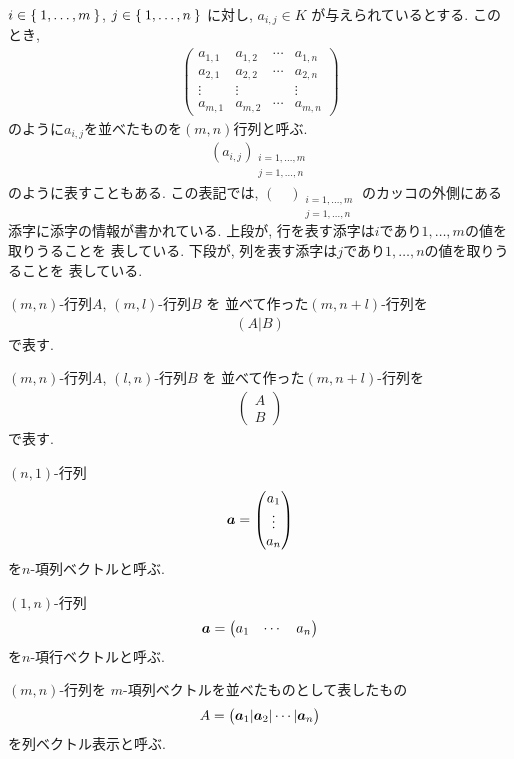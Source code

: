 $i\in\Set{1,\ldots,m}$,
$j\in\Set{1,\ldots,n}$
に対し,
$a_{i,j}\in K$
が与えられているとする.
このとき,
\begin{align*}
    \begin{pmatrix}
      a_{1,1}&a_{1,2}&\cdots &a_{1,n}\\
      a_{2,1}&a_{2,2}&\cdots &a_{2,n}\\
      \vdots&\vdots &&\vdots\\
      a_{m,1}&a_{m,2}&\cdots &a_{m,n}
    \end{pmatrix}
\end{align*}
のように$a_{i,j}$を並べたものを$(m,n)$行列と呼ぶ.
\begin{align*}
  (a_{i,j})_{\substack{i=1,\ldots,m\\j=1,\ldots,n}}
\end{align*}
のように表すこともある.
この表記では,
$(\quad)_{\substack{i=1,\ldots,m\\j=1,\ldots,n}}$
のカッコの外側にある添字に添字の情報が書かれている.
上段が, 行を表す添字は$i$であり$1,\ldots,m$の値を取りうることを
表している.
下段が, 列を表す添字は$j$であり$1,\ldots,n$の値を取りうることを
表している.

$(m,n)$-行列$A$,
$(m,l)$-行列$B$
を
並べて作った$(m,n+l)$-行列を
\begin{align*}(A|B)\end{align*}
で表す.

$(m,n)$-行列$A$,
$(l,n)$-行列$B$
を
並べて作った$(m,n+l)$-行列を
\begin{align*}
  \begin{pmatrix}A\\\hline B\end{pmatrix}\end{align*}
で表す.

$(n,1)$-行列
\begin{align*}
  \boldsymbol{a}=
  \begin{pmatrix}a_1
  \\\vdots\\a_n
  \end{pmatrix}
\end{align*}
を$n$-項列ベクトルと呼ぶ.

$(1,n)$-行列
\begin{align*}
  \boldsymbol{a}=
  \begin{pmatrix}a_1
  &\cdots&a_n
  \end{pmatrix}
\end{align*}
を$n$-項行ベクトルと呼ぶ.

$(m,n)$-行列を
$m$-項列ベクトルを並べたものとして表したもの
\begin{align*}
  A=\begin{pmatrix}\boldsymbol{a}_1|\boldsymbol{a}_2|\cdots|\boldsymbol{a}_n\end{pmatrix}
\end{align*}
を列ベクトル表示と呼ぶ.


